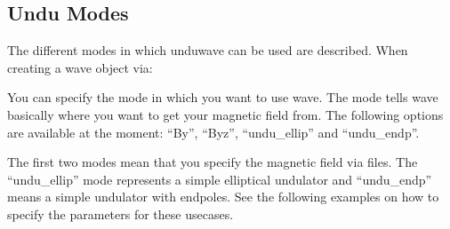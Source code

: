 \documentclass[letterpaper,10pt,english]{sphinxmanual}
\begin{document}
\subsection{Undu Modes}
\label{\detokenize{quickguide:undu-modes}}
\sphinxAtStartPar
The different modes in which unduwave can be used are described. When creating a wave object via:

\begin{sphinxVerbatim}[commandchars=\\\{\},numbers=left,firstnumber=1,stepnumber=1]
  
\end{sphinxVerbatim}

\begin{DUlineblock}{0em}
\item[] You can specify the mode in which you want to use wave. The mode tells wave basically where you want to get your magnetic field from. The following options are available at the moment: “By”, “Byz”, “undu\_ellip” and “undu\_endp”.
\end{DUlineblock}

\begin{DUlineblock}{0em}
\item[] The first two modes mean that you specify the magnetic field via files. The “undu\_ellip” mode represents a simple elliptical undulator and “undu\_endp” means a simple undulator with endpoles. See the following examples on how to specify the parameters for these use\sphinxhyphen{}cases.
\end{DUlineblock}
\end{document}
